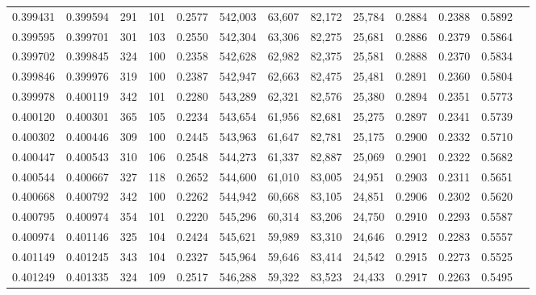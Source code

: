 \begin{tabular}{rrrrrrrrrrrrr}
0.399431 & 0.399594 &   291 & 101 &                                     0.2577 & 542,003 &  63,607 &  82,172 &  25,784 & 0.2884 & 0.2388 & 0.5892 \\
0.399595 & 0.399701 &   301 & 103 &                                     0.2550 & 542,304 &  63,306 &  82,275 &  25,681 & 0.2886 & 0.2379 & 0.5864 \\
0.399702 & 0.399845 &   324 & 100 &                                     0.2358 & 542,628 &  62,982 &  82,375 &  25,581 & 0.2888 & 0.2370 & 0.5834 \\
0.399846 & 0.399976 &   319 & 100 &                                     0.2387 & 542,947 &  62,663 &  82,475 &  25,481 & 0.2891 & 0.2360 & 0.5804 \\
0.399978 & 0.400119 &   342 & 101 &                                     0.2280 & 543,289 &  62,321 &  82,576 &  25,380 & 0.2894 & 0.2351 & 0.5773 \\
0.400120 & 0.400301 &   365 & 105 &                                     0.2234 & 543,654 &  61,956 &  82,681 &  25,275 & 0.2897 & 0.2341 & 0.5739 \\
0.400302 & 0.400446 &   309 & 100 &                                     0.2445 & 543,963 &  61,647 &  82,781 &  25,175 & 0.2900 & 0.2332 & 0.5710 \\
0.400447 & 0.400543 &   310 & 106 &                                     0.2548 & 544,273 &  61,337 &  82,887 &  25,069 & 0.2901 & 0.2322 & 0.5682 \\
0.400544 & 0.400667 &   327 & 118 &                                     0.2652 & 544,600 &  61,010 &  83,005 &  24,951 & 0.2903 & 0.2311 & 0.5651 \\
0.400668 & 0.400792 &   342 & 100 &                                     0.2262 & 544,942 &  60,668 &  83,105 &  24,851 & 0.2906 & 0.2302 & 0.5620 \\
0.400795 & 0.400974 &   354 & 101 &                                     0.2220 & 545,296 &  60,314 &  83,206 &  24,750 & 0.2910 & 0.2293 & 0.5587 \\
0.400974 & 0.401146 &   325 & 104 &                                     0.2424 & 545,621 &  59,989 &  83,310 &  24,646 & 0.2912 & 0.2283 & 0.5557 \\
0.401149 & 0.401245 &   343 & 104 &                                     0.2327 & 545,964 &  59,646 &  83,414 &  24,542 & 0.2915 & 0.2273 & 0.5525 \\
0.401249 & 0.401335 &   324 & 109 &                                     0.2517 & 546,288 &  59,322 &  83,523 &  24,433 & 0.2917 & 0.2263 & 0.5495 \\

\end{tabular}
